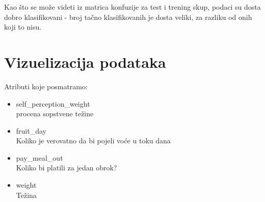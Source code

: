 \documentclass[12pt,a4paper]{article}
\begin{document}
Kao \v sto se mo\v ze videti iz matrica konfuzije za test i trening skup, podaci su dosta dobro klasifikovani - broj ta\v cno klasifikovanih je dosta veliki, za razliku od onih koji to nisu.

\newpage

\section{Vizuelizacija podataka}

Atributi koje posmatramo:
\begin{itemize}
  \item self\_perception\_weight\\
    procena sopstvene te\v zine
  \item fruit\_day\\
    Koliko je verovatno da bi pojeli vo\' ce u toku dana
  \item pay\_meal\_out\\
    Koliko bi platili za jedan obrok?
   \item weight\\
     Te\v zina
\end{itemize}
\end{document}
